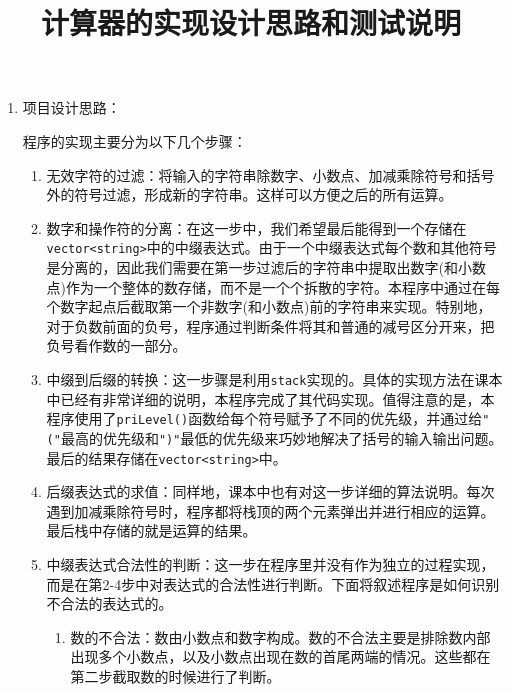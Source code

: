 \documentclass[a4paper,12pt]{article}
\begin{document}
\title{\hei 计算器的实现设计思路和测试说明}


\maketitle


\begin{enumerate}
\item 项目设计思路：

程序的实现主要分为以下几个步骤：
\begin{enumerate}
    \item {\hei 无效字符的过滤}：将输入的字符串除数字、小数点、加减乘除符号和括号外的符号过滤，形成新的字符串。这样可以方便之后的所有运算。
    \item {\hei 数字和操作符的分离}：在这一步中，我们希望最后能得到一个存储在\verb|vector<string>|中的中缀表达式。由于一个中缀表达式每个数和其他符号是分离的，因此我们需要在第一步过滤后的字符串中提取出数字(和小数点)作为一个整体的数存储，而不是一个个拆散的字符。本程序中通过在每个数字起点后截取第一个非数字(和小数点)前的字符串来实现。{\hei 特别地}，对于负数前面的负号，程序通过判断条件将其和普通的减号区分开来，把负号看作数的一部分。
    \item {\hei 中缀到后缀的转换}：这一步骤是利用\verb|stack|实现的。具体的实现方法在课本中已经有非常详细的说明，本程序完成了其代码实现。值得注意的是，本程序使用了\verb|priLevel()|函数给每个符号赋予了不同的优先级，并通过给\verb|"("|最高的优先级和\verb|")"|最低的优先级来巧妙地解决了括号的输入输出问题。最后的结果存储在\verb|vector<string>|中。
    \item {\hei 后缀表达式的求值}：同样地，课本中也有对这一步详细的算法说明。每次遇到加减乘除符号时，程序都将栈顶的两个元素弹出并进行相应的运算。最后栈中存储的就是运算的结果。
    \item {\hei 中缀表达式合法性的判断}：{\hei 这一步在程序里并没有作为独立的过程实现，而是在第2-4步中对表达式的合法性进行判断}。下面将叙述程序是如何识别不合法的表达式的。
    \begin{enumerate}
        \item 数的不合法：数由小数点和数字构成。数的不合法主要是排除数内部出现多个小数点，以及小数点出现在数的首尾两端的情况。这些都在第二步截取数的时候进行了判断。

\end{enumerate}
\end{enumerate}
\end{enumerate}
\end{document}
